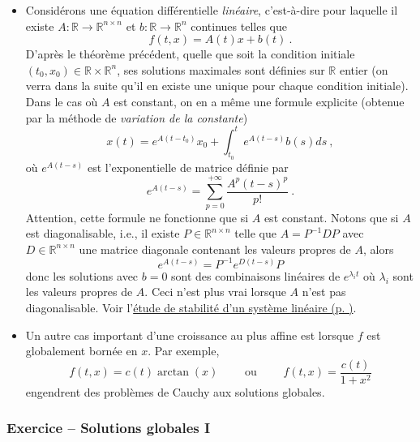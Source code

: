 \hypertarget{ex_solGlob}{}
\begin{exemple}\label{ex_solGlob}
\begin{itemize}
\item
  Considérons une équation différentielle \emph{linéaire}, c'est-à-dire
  pour laquelle il existe \(A:\mathbb{R}\to\mathbb{R}^{n\times n}\) et
  \(b:\mathbb{R}\to\mathbb{R}^n\) continues telles que \[
  f(t,x) = A(t) x + b(t) \ .
  \] D'après le théorème précédent, quelle que soit la condition
  initiale \((t_0,x_0)\in \mathbb{R}\times\mathbb{R}^n\), ses solutions maximales
  sont définies sur \(\mathbb{R}\) entier (on verra dans la suite qu'il en existe
  une unique pour chaque condition initiale). Dans le cas où \(A\) est
  constant, on en a même une formule explicite (obtenue par la méthode
  de \emph{variation de la constante}) \[
  x(t) = e^{A(t-t_0)}x_0 + \int_{t_0}^t e^{A(t-s)} b(s)ds \ ,
  \] où \(e^{A(t-s)}\) est l'exponentielle de matrice définie par \[
  e^{A(t-s)}=\sum^{+\infty}_{p=0} \frac{A^p(t-s)^p}{p!} \ .
  \] Attention, cette formule ne fonctionne que si \(A\) est constant.
  Notons que si \(A\) est diagonalisable, i.e., il existe
  \(P\in \mathbb{R}^{n\times n}\) telle que \(A = P^{-1} D P\) avec
  \(D\in \mathbb{R}^{n\times n}\) une matrice diagonale contenant les
  valeurs propres de \(A\), alors \[
  e^{A(t-s)} = P^{-1} e^{D(t-s)}  P
  \] donc les solutions avec \(b=0\) sont des combinaisons linéaires de
  \(e^{\lambda_i t}\) où \(\lambda_i\) sont les valeurs propres de
  \(A\). Ceci n'est plus vrai lorsque \(A\) n'est pas diagonalisable.
  Voir l'\protect\hyperlink{Hurwitz}{étude de stabilité d'un système
  linéaire (p. \pageref*{Hurwitz})}.
\item
  Un autre cas important d'une croissance au plus affine est lorsque
  \(f\) est globalement bornée en \(x\). Par exemple, \[
  f(t,x)=c(t)\arctan(x) \qquad \text{ ou } \qquad 
  f(t,x)=\frac{c(t)}{1+x^2}
  \] engendrent des problèmes de Cauchy aux solutions globales.
\end{itemize}
\end{exemple}

\hypertarget{glob_sol}{%
\subsubsection*{\texorpdfstring{Exercice -- Solutions globales I
}{Exercice -- Solutions globales I}}\label{glob_sol}}


